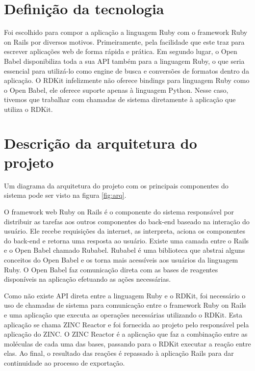 \documentclass{abnt}
\begin{document}
\section{Definição da tecnologia}

Foi escolhido para compor a aplicação a linguagem Ruby com o framework Ruby on Rails
por diversos motivos. Primeiramente, pela facilidade que este traz para escrever
aplicações web de forma rápida e prática. Em segundo lugar, o Open Babel disponibiliza
toda a sua API também para a linguagem Ruby, o que seria essencial para utilizá-lo
como engine de busca e conversões de formatos dentro da aplicação. O RDKit infelizmente
não oferece bindings para linguagem Ruby como o Open Babel, ele oferece suporte
apenas à linguagem Python. Nesse caso, tivemos que trabalhar com chamadas de sistema
diretamente à aplicação que utiliza o RDKit.

\section{Descrição da arquitetura do projeto}

Um diagrama da arquitetura do projeto com os principais componentes do sistema pode
ser visto na figura \ref{fig:arq}.

O framework web Ruby on Rails é o componente do sistema responsável por distribuir
as tarefas aos outros componentes do back-end baseado na interação do usuário. Ele
recebe requisições da internet, as interpreta, aciona os componentes do back-end
e retorna uma resposta ao usuário. Existe uma camada entre o Rails e o Open Babel
chamado Rubabel. Rubabel é uma biblioteca que abstrai alguns conceitos do Open Babel
e os torna mais acessíveis aos usuários da linguagem Ruby. O Open Babel faz comunicação
direta com as bases de reagentes disponíveis na aplicação efetuando as ações necessárias.

Como não existe API direta entre a linguagem Ruby e o RDKit, foi necessário o uso
de chamadas de sistema para comunicação entre o framework Ruby on Rails e uma aplicação
que executa as operações necessárias utilizando o RDKit. Esta aplicação se chama
ZINC Reactor e foi fornecida ao projeto pelo responsável pela aplicação do ZINC.
O ZINC Reactor é a aplicação que faz a combinação entre as moléculas de cada uma
das bases, passando para o RDKit executar a reação entre elas. Ao final, o resultado
das reações é repassado à aplicação Rails para dar continuidade ao processo de exportação.
\end{document}
